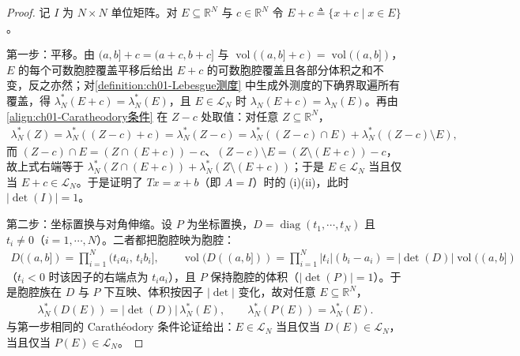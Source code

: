 \documentclass[../../main.tex]{subfiles}%
\begin{document}
\begin{proof}
记 $I$ 为 $N\times N$ 单位矩阵。对 $E\subseteq\mathbb{R}^N$ 与 $c\in\mathbb{R}^N$ 令 $E+c\triangleq\{x+c\mid x\in E\}$。

第一步：平移。由 $(a,b]+c=(a+c,b+c]$ 与 $\operatorname{vol}((a,b]+c)=\operatorname{vol}((a,b])$，$E$ 的每个可数胞腔覆盖平移后给出 $E+c$ 的可数胞腔覆盖且各部分体积之和不变，反之亦然；对\cref{definition:ch01-Lebesgue测度} 中生成外测度的下确界取遍所有覆盖，得 $\lambda_N^*(E+c)=\lambda_N^*(E)$，且 $E\in\mathcal{L}_N$ 时 $\lambda_N(E+c)=\lambda_N(E)$。再由\eqref{align:ch01-Caratheodory条件} 在 $Z-c$ 处取值：对任意 $Z\subseteq\mathbb{R}^N$，
\begin{align*}
\lambda_N^*(Z)=\lambda_N^*((Z-c)+c)=\lambda_N^*(Z-c)=\lambda_N^*((Z-c)\cap E)+\lambda_N^*((Z-c)\setminus E),
\end{align*}
而 $(Z-c)\cap E=(Z\cap(E+c))-c$、$(Z-c)\setminus E=(Z\setminus(E+c))-c$，故上式右端等于 $\lambda_N^*(Z\cap(E+c))+\lambda_N^*(Z\setminus(E+c))$；于是 $E\in\mathcal{L}_N$ 当且仅当 $E+c\in\mathcal{L}_N$。于是证明了 $Tx=x+b$（即 $A=I$）时的 (i)(ii)，此时 $|\det(I)|=1$。

第二步：坐标置换与对角伸缩。设 $P$ 为坐标置换，$D=\operatorname{diag}(t_1,\cdots ,t_N)$ 且 $t_i\neq0$（$i=1,\cdots ,N$）。二者都把胞腔映为胞腔：
\begin{align*}
D((a,b])=\prod_{i=1}^N(t_ia_i,\,t_ib_i],\qquad
\operatorname{vol}(D((a,b]))=\prod_{i=1}^N|t_i|(b_i-a_i)=|\det(D)|\operatorname{vol}((a,b])
\end{align*}
（$t_i<0$ 时该因子的右端点为 $t_ia_i$），且 $P$ 保持胞腔的体积（$|\det(P)|=1$）。于是胞腔族在 $D$ 与 $P$ 下互映、体积按因子 $|\det|$ 变化，故对任意 $E\subseteq\mathbb{R}^N$，
\begin{align*}
\lambda_N^*(D(E))=|\det(D)|\,\lambda_N^*(E),\qquad \lambda_N^*(P(E))=\lambda_N^*(E).
\end{align*}
与第一步相同的 Carathéodory 条件论证给出：$E\in\mathcal{L}_N$ 当且仅当 $D(E)\in\mathcal{L}_N$，当且仅当 $P(E)\in\mathcal{L}_N$。


\end{proof}
\end{document}
